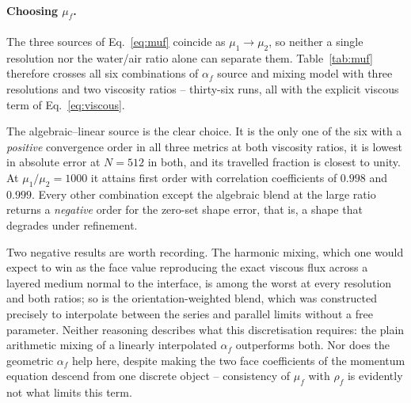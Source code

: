 \documentclass[preprint,3p,11pt]{elsarticle}
\begin{document}
\paragraph{Choosing $\mu_f$.} The three sources of Eq.~\eqref{eq:muf} coincide as
$\mu_1\to\mu_2$, so neither a single resolution nor the water/air ratio alone can separate
them. Table~\ref{tab:muf} therefore crosses all six combinations of $\alpha_f$ source and
mixing model with three resolutions and two viscosity ratios -- thirty-six runs, all with
the explicit viscous term of Eq.~\eqref{eq:viscous}.

The algebraic--linear source is the clear choice. It is the only one of the six with a
\emph{positive} convergence order in all three metrics at both viscosity ratios, it is
lowest in absolute error at $N=512$ in both, and its travelled fraction is closest to unity.
At $\mu_1/\mu_2=1000$ it attains first order with correlation coefficients of $0.998$ and
$0.999$. Every other combination except the algebraic blend at the large ratio returns a
\emph{negative} order for the zero-set shape error, that is, a shape that degrades under
refinement.

Two negative results are worth recording. The harmonic mixing, which one would expect to
win as the face value reproducing the exact viscous flux across a layered medium normal to
the interface, is among the worst at every resolution and both ratios; so is the
orientation-weighted blend, which was constructed precisely to interpolate between the
series and parallel limits without a free parameter. Neither reasoning describes what this
discretisation requires: the plain arithmetic mixing of a linearly interpolated $\alpha_f$
outperforms both. Nor does the geometric $\alpha_f$ help here, despite making the two face
coefficients of the momentum equation descend from one discrete object -- consistency of
$\mu_f$ with $\rho_f$ is evidently not what limits this term.
\end{document}

